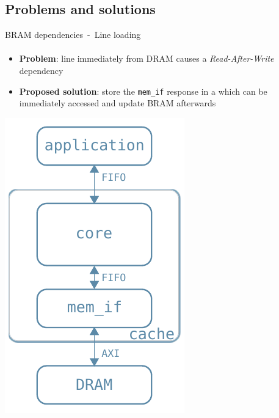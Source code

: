 \documentclass[handout]{beamer}
\begin{document}
\subsection{Problems and solutions}
\begin{frame}{BRAM dependencies~-~Line loading}
	\framesubtitle{}
	\begin{minipage}{.7\textwidth}
		\begin{itemize}[<+->]
			\item \textbf{Problem}:
				 line immediately
				 from DRAM
				causes a \emph{Read-After-Write} dependency
			\item \textbf{Proposed solution}:
				store the \texttt{mem\_if} response in a
				 which can be immediately
				accessed and update BRAM afterwards
		\end{itemize}
	\end{minipage}
	\begin{minipage}{.28\textwidth}
		\begin{center}
			\includegraphics[width=.9\textwidth]{internal_arch.pdf}
		\end{center}
	\end{minipage}
\end{frame}
\end{document}
